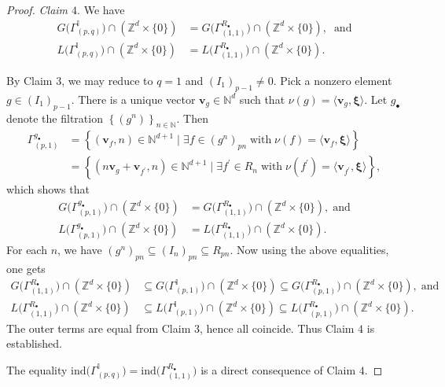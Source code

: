 \documentclass[12pt,a4paper]{amsart}
\theoremstyle{plain}
\theoremstyle{definition}
\numberwithin{equation}{theorem}
\begin{document}
\begin{proof}
\vspace{0.2cm}
\noindent
\emph{Claim $4$}. We have
\begin{align*}
G\big(\Gamma^{\mathbb{I}}_{(p,q)}\big) \cap \left(\mathbb{Z}^d\times \{0\}\right) &= G\big(\Gamma^{R_{\bullet}}_{(1,1)}\big) \cap \left(\mathbb{Z}^d\times \{0\}\right),\;\;\text{and}\\
L\big(\Gamma^{\mathbb{I}}_{(p,q)}\big) \cap \left(\mathbb{Z}^d\times \{0\}\right) &= L\big(\Gamma^{R_{\bullet}}_{(1,1)}\big) \cap \left(\mathbb{Z}^d\times \{0\}\right).
\end{align*}

By Claim $3$, we may reduce to $q=1$ and $(I_1)_{p-1}\neq 0$. Pick a nonzero element $g \in {\left(I_{1}\right)}_{p-1}$. There is a unique vector $\mathbf{v}_g \in \mathbb{N}^d$ such that $\nu(g) = \langle \mathbf{v}_g, \boldsymbol{\xi}\rangle$. Let $g_{\bullet}$ denote the filtration $\left\{(g^n)\right\}_{n\in\mathbb{N}}$. Then
\begin{align*}
\Gamma^{g_{\bullet}}_{(p,1)} &= \left\{(\mathbf{v}_f,n)\in\mathbb{N}^{d+1} \mid \exists f \in {(g^{n})}_{pn}\;\text{with}\;\nu(f) = \langle \mathbf{v}_f, \boldsymbol{\xi} \rangle\right\}\\
  &= \left\{(n\mathbf{v}_g + \mathbf{v}_{f^{\prime}},n)\in\mathbb{N}^{d+1} \mid \exists f^{\prime} \in {R}_{n}\;\text{with}\;\nu(f^{\prime}) = \langle \mathbf{v}_{f^{\prime}}, \boldsymbol{\xi} \rangle\right\},
\end{align*}
which shows that
\begin{align*}
 G\big(\Gamma^{g_{\bullet}}_{(p,1)}\big)\cap \left(\mathbb{Z}^d\times \{0\}\right) &= G\big(\Gamma^{R_{\bullet}}_{(1,1)}\big)\cap \left(\mathbb{Z}^d\times \{0\}\right),\;\text{and}\\
  L\big(\Gamma^{g_{\bullet}}_{(p,1)}\big)\cap \left(\mathbb{Z}^d\times \{0\}\right) &= L\big(\Gamma^{R_{\bullet}}_{(1,1)}\big)\cap \left(\mathbb{Z}^d\times \{0\}\right).
 \end{align*}
For each $n$, we have $(g^n)_{pn} \subseteq (I_n)_{pn} \subseteq R_{pn}$. Now using the above equalities, one gets
\begin{align*}
 G\big(\Gamma^{R_{\bullet}}_{(1,1)}\big)\cap \left(\mathbb{Z}^d\times \{0\}\right) &\subseteq G\big(\Gamma^{\mathbb{I}}_{(p,1)}\big)\cap \left(\mathbb{Z}^d\times \{0\}\right) \subseteq G\big(\Gamma^{R_{\bullet}}_{(p,1)}\big)\cap \left(\mathbb{Z}^d\times \{0\}\right),\;\text{and}\\
 L\big(\Gamma^{R_{\bullet}}_{(1,1)}\big)\cap \left(\mathbb{Z}^d\times \{0\}\right) &\subseteq L\big(\Gamma^{\mathbb{I}}_{(p,1)}\big)\cap \left(\mathbb{Z}^d\times \{0\}\right) \subseteq L\big(\Gamma^{R_{\bullet}}_{(p,1)}\big)\cap \left(\mathbb{Z}^d\times \{0\}\right).
\end{align*}
The outer terms are equal from Claim $3$, hence all coincide. Thus Claim $4$ is established.

The equality $\mathrm{ind}\big(\Gamma^{\mathbb{I}}_{(p,q)}\big) = \mathrm{ind}\big(\Gamma^{R_{\bullet}}_{(1,1)}\big)$ is a direct consequence of Claim $4$.
\end{proof}
\end{document}

